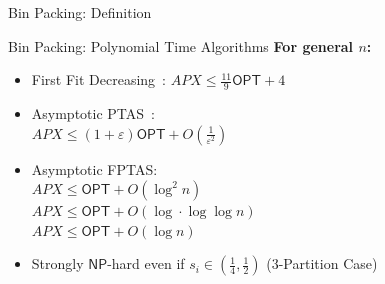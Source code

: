 \documentclass[xcolor=table]{beamer} %
\renewcommand{\epsilon}{\varepsilon}
\renewcommand{\phi}{\varphi}
\theoremstyle{definition}
\theoremstyle{plain}
\theoremstyle{remark}
\renewcommand{\a}[1]{\textcolor{dred}{#1}}
\renewcommand{\b}[1]{\textcolor{dblue}{#1}}
\newcommand{\p}[1]{\textcolor{phi}{#1}}
\begin{document}
\begin{frame}{Bin Packing: Definition}


\end{frame}

\begin{frame}{Bin Packing: Polynomial Time Algorithms}
\textbf{\b{For general $n$:}}

\begin{itemize}
    
    \item  First Fit Decreasing~\cite{johnson1974worst}: $APX \leq \frac{11}{9}\mathsf{OPT} + 4$
    \pause
    \item  Asymptotic PTAS~\cite{de1981bin}: \\
    $APX \leq (1+\epsilon)\mathsf{OPT} + O(\frac{1}{{\epsilon}^2})$
    \pause
    \item  Asymptotic FPTAS:
    \\
    $APX \leq \mathsf{OPT} + O({\log}^2 n)$~\cite{karmarkar1982efficient} \\
    $APX \leq \mathsf{OPT} + O(\log \cdot \log \log n)$~\cite{rothvoss2013approximating}
    \\
    $APX \leq \mathsf{OPT} + O(\log n)$~\cite{hoberg2017logarithmic}
    \pause
    \item  Strongly $\mathsf{NP}$-hard even if $s_i \in (\frac{1}{4}, \frac{1}{2})$ \a{(3-Partition Case)}
    
\end{itemize}

\end{frame}
\end{document}
